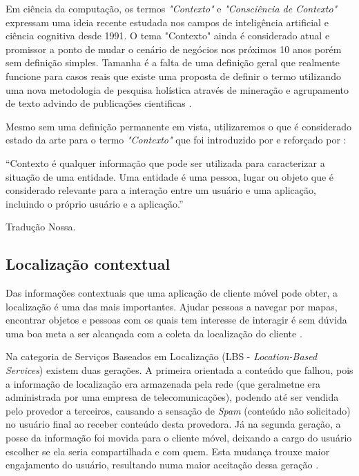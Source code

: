 Em ciência da computação, os termos \textit{"Contexto"} e \textit{"Consciência
de Contexto"} expressam uma ideia recente estudada nos campos de inteligência
artificial e ciência cognitiva desde 1991. O tema "Contexto" ainda é considerado
atual e promissor a ponto de mudar o cenário de negócios nos próximos 10 anos
porém sem definição simples. Tamanha é a falta de uma definição geral que
realmente funcione para casos reais que existe uma proposta de definir o termo
utilizando uma nova metodologia de pesquisa holística através de mineração e
agrupamento de texto advindo de publicações cientificas \cite{Pascalau2013}.

Mesmo sem uma definição permanente em vista, utilizaremos o que é considerado
estado da arte para o termo \textit{"Contexto"} que foi introduzido por
 e reforçado por :

\begin{citacao}

	``Contexto é qualquer informação que pode ser utilizada para caracterizar a
	situação de uma entidade. Uma entidade é uma pessoa, lugar ou objeto que é
	considerado relevante para a interação entre um usuário e uma aplicação,
	incluindo o próprio usuário e a aplicação.'' \

	 Tradução Nossa.
\end{citacao}

\subsection{Localização contextual}
\label{subsec:Localização contextual}

Das informações contextuais que uma aplicação de cliente móvel pode obter, a
localização é uma das mais importantes. Ajudar pessoas a navegar por mapas,
encontrar objetos e pessoas com os quais tem interesse de interagir é sem dúvida
uma boa meta a ser alcançada com a coleta da localização do cliente
\cite{Bellavista2008}.

Na categoria de Serviços Baseados em Localização (LBS - \textit{Location-Based
Services}) existem duas gerações. A primeira orientada a conteúdo que falhou,
pois a informação de localização era armazenada pela rede (que geralmetne era
administrada por uma empresa de telecomunicações), podendo até ser vendida pelo
provedor a terceiros, causando a sensação de \textit{Spam} (conteúdo não
solicitado) no usuário final ao receber conteúdo desta provedora. Já na segunda
geração, a posse da informação foi movida para o cliente móvel, deixando a cargo
do usuário escolher se ela seria compartilhada e com quem. Esta mudança trouxe
maior engajamento do usuário, resultando numa maior aceitação dessa geração
\cite{Bellavista2008}.


